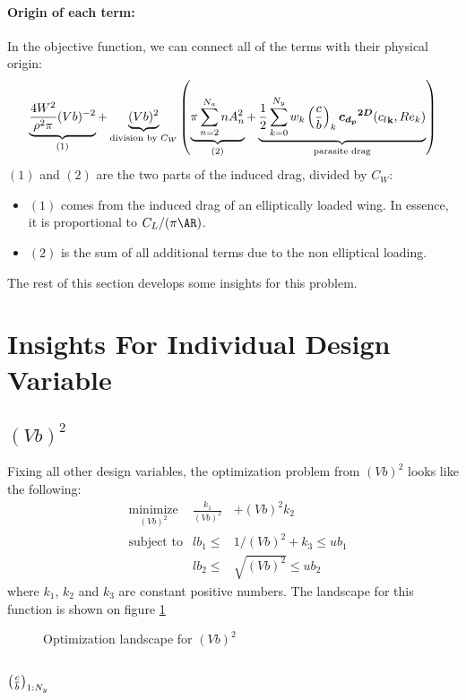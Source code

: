 \documentclass[letterpaper,12pt]{article}
\begin{document}
\paragraph{Origin of each term:}In the objective function, we can connect all of the terms with their physical origin:
$$
\underbrace{\frac{4W^2}{\rho^2 \pi} (Vb)^{-2}}_{(1)} + 
\underbrace{(Vb)^2}_{\text{division by $C_W$}}
\left( 
\underbrace{\pi \sum_{n=2}^{N_a} n A_n^2}_{(2)} +  
\underbrace{
\frac {1} {2} \sum_{k=0}^{N_y} w_k \left( \frac c b \right)_{k} \boldsymbol{{c_{d_p}}^{2D}}({c_l}_{\bf k}, Re_k)}_{\text{parasite drag}} \right)$$
$(1)$ and $(2)$ are the two parts of the induced drag, divided by $C_W$:
\begin{itemize}
\item $(1)$ comes from the induced drag of an elliptically loaded wing. In essence, it is proportional to $C_L / (\pi \AR)$.
\item $(2)$ is the sum of all additional terms due to the non elliptical loading.
\end{itemize}

The rest of this section develops some insights for this problem.

\section{Insights For Individual Design Variable}

\subsection{$(Vb)^2$}

Fixing all other design variables, the optimization problem from $(Vb)^2$ looks like the following:
\begin{align*}
	& \underset{(Vb)^2}{\text{minimize}}  &
	\frac{k_1}{(Vb)^{2}} &+ (Vb)^2 k_2  \\
	& \text{subject to} & lb_1 \leq & 1 / (Vb)^2 + k_3 \leq ub_1 \\
	& & lb_2 \leq & \sqrt{(Vb)^2} \leq ub_2
\end{align*}
where $k_1$, $k_2$ and $k_3$ are constant positive numbers.
%
The landscape for this function is shown on figure \ref{fig:Vb2img}

\begin{figure}[h]
	\centering
	\caption{Optimization landscape for $(Vb)^2$}
	\label{fig:Vb2img}
\end{figure}

\subsection{$\left( \frac c b \right)_{1:N_y}$}
\end{document}
